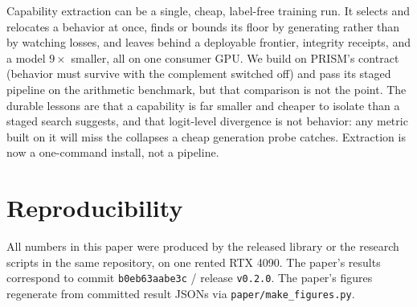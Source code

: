\documentclass{article}
\begin{document}
Capability extraction can be a single, cheap, label-free training run. It
selects and relocates a behavior at once, finds or bounds its floor by
generating rather than by watching losses, and leaves behind a deployable
frontier, integrity receipts, and a model $9\times$ smaller, all on one
consumer GPU. We build on PRISM's contract (behavior must survive with the
complement switched off) and pass its staged pipeline on the arithmetic
benchmark, but that comparison is not the point. The durable lessons are that
a capability is far
smaller and cheaper to isolate than a staged search suggests, and that
logit-level divergence is not behavior: any metric built on it will miss the
collapses a cheap generation probe catches. Extraction is now a one-command
install, not a pipeline.

\section*{Reproducibility}

All numbers in this paper were produced by the released library or the
research scripts in the same repository, on one rented RTX 4090. The paper's
results correspond to commit \texttt{b0eb63aabe3c} / release
\texttt{v0.2.0}. The paper's figures regenerate from committed result JSONs via
\texttt{paper/make\_figures.py}.



\end{document}
